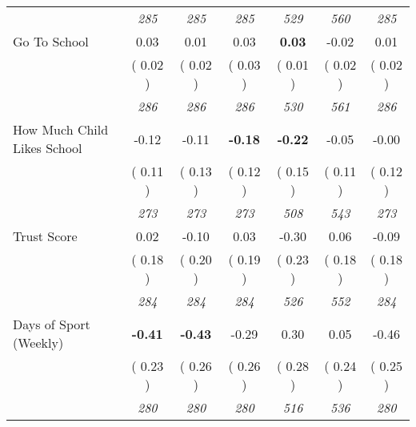 \begin{tabular}{l c c c c c c}
& \textit{ 285 } & \textit{ 285 } & \textit{ 285 } & \textit{ 529 } & \textit{ 560 } & \textit{ 285 } \\
Go To School &      0.03 &      0.01 &      0.03 & \textbf{      0.03 } &     -0.02 &      0.01 \\
& (     0.02 ) & (     0.02 ) & (     0.03 ) & (     0.01 ) & (     0.02 ) & (     0.02 ) \\
& \textit{ 286 } & \textit{ 286 } & \textit{ 286 } & \textit{ 530 } & \textit{ 561 } & \textit{ 286 } \\
How Much Child Likes School &     -0.12 &     -0.11 & \textbf{     -0.18 } & \textbf{     -0.22 } &     -0.05 &     -0.00 \\
& (     0.11 ) & (     0.13 ) & (     0.12 ) & (     0.15 ) & (     0.11 ) & (     0.12 ) \\
& \textit{ 273 } & \textit{ 273 } & \textit{ 273 } & \textit{ 508 } & \textit{ 543 } & \textit{ 273 } \\
Trust Score &      0.02 &     -0.10 &      0.03 &     -0.30 &      0.06 &     -0.09 \\
& (     0.18 ) & (     0.20 ) & (     0.19 ) & (     0.23 ) & (     0.18 ) & (     0.18 ) \\
& \textit{ 284 } & \textit{ 284 } & \textit{ 284 } & \textit{ 526 } & \textit{ 552 } & \textit{ 284 } \\
Days of Sport (Weekly) & \textbf{     -0.41 } & \textbf{     -0.43 } &     -0.29 &      0.30 &      0.05 &     -0.46 \\
& (     0.23 ) & (     0.26 ) & (     0.26 ) & (     0.28 ) & (     0.24 ) & (     0.25 ) \\
& \textit{ 280 } & \textit{ 280 } & \textit{ 280 } & \textit{ 516 } & \textit{ 536 } & \textit{ 280 } \\
\bottomrule
\end{tabular}
